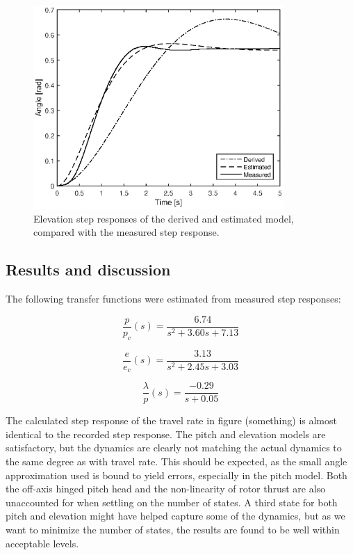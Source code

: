 \begin{figure}[hp]
	\centering
		\includegraphics[width=0.85\textwidth]{figures/1/elev_model_comparison.eps}
	\caption{Elevation step responses of the derived and estimated model, compared with the measured step response.}
	\label{fig:elev_model_comparison}
\end{figure}


\subsection{Results and discussion}
\label{subsection:part1_results}


The following transfer functions were estimated from measured step responses:

\begin{equation}
\label{eq:p_pc}
	\frac{p}{p_c}(s) = \frac{6.74}{s^2 + 3.60 s + 7.13}
\end{equation}

\begin{equation}
\label{eq:e_ec}
	\frac{e}{e_c}(s) = \frac{3.13}{s^2 + 2.45 s + 3.03}
\end{equation}

\begin{equation}
\label{eq:travelRate_p}
	\frac{\lambda}{p}(s) = \frac{-0.29}{s + 0.05}
\end{equation}


The calculated step response of the travel rate in figure (something) is almost identical to the recorded step response. The pitch and elevation models are satisfactory, but the dynamics are clearly not matching the actual dynamics to the same degree as with travel rate. This should be expected, as the small angle approximation used is bound to yield errors, especially in the pitch model. Both the off-axis hinged pitch head and the non-linearity of rotor thrust are also unaccounted for when settling on the number of states. A third state for both pitch and elevation might have helped capture some of the dynamics, but as we want to minimize the number of states, the results are found to be well within acceptable levels.




